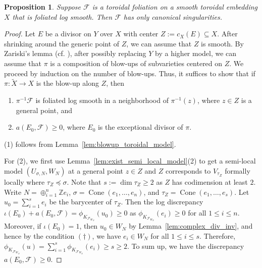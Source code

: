 \documentclass[12pt,reqno]{amsart}
\newtheorem{proposition}[theorem]{Proposition}
\theoremstyle{definition}
\newcommand{\on}{\operatorname}
\newcommand\cF{{\mathcal{F}}}
\newcommand\bZ{{\mathbb Z}}
\begin{document}
\begin{proposition}\label{SimpleCanonical}
    Suppose $\cF$ is a toroidal foliation on a smooth toroidal embedding $X$ that is foliated log smooth. 
    Then $\cF$ has only canonical singularities.
\end{proposition}
\begin{proof}
    Let $E$ be a divisor on $Y$ over $X$ with center $Z:=c_X(E)\subseteq X$.
    After shrinking around the generic point of $Z$, we can assume that $Z$ is smooth. 
    By Zariski's lemma (cf. \cite[Lemma 2.45]{KM98}), after possibly replacing $Y$ by a higher model, we can assume that $\pi$ is a composition of blow-ups of subvarieties centered on $Z$. 
    We proceed by induction on the number of blow-ups. 
    Thus, it suffices to show that if $\pi\colon \widetilde{X}\to X$ is the blow-up along $Z$, then 
    \begin{enumerate}
        \item $\pi^{-1}\cF$ is foliated log smooth in a neighborhood of $\pi^{-1}(z)$, where $z\in Z$ is a general point, and
        \item $a(E_0,\cF)\geq 0$, where $E_0$ is the exceptional divisor of $\pi$. 
    \end{enumerate}
    
    (1) follows from Lemma~\ref{lem:blowup_toroidal_model}. 
    
    For (2), we first use Lemma~\ref{lem:exist_semi_local_model}(2) to get a semi-local model $(U_{\sigma,N},W_N)$ at a general point $z\in Z$ and $Z$ corresponds to $V_{\tau_Z}$ formally locally where $\tau_Z\preceq\sigma$. 
    Note that $s:=\dim\tau_Z\geq 2$ as $Z$ has codimension at least $2$. 
    Write $N=\oplus_{i=1}^n\bZ e_i$, $\sigma=\on{Cone}(e_1,\ldots,e_n)$, and $\tau_Z=\on{Cone}(e_1,\ldots,e_s)$. 
    Let $u_0=\sum_{i=1}^s e_i$ be the barycenter of $\tau_Z$. 
    Then the log discrepancy $\iota(E_0)+a(E_0,\cF) = \phi_{K_{\cF_{W_N}}}(u_0)\geq 0$ as $\phi_{K_{\cF_{W_N}}}(e_i)\geq 0$ for all $1\leq i\leq n$. 
    Moreover, if $\iota(E_0)=1$, then $u_0\in W_N$ by Lemma~\ref{lem:complex_div_inv}, and hence by the condition $(\dagger)$, we have $e_i\in W_N$ for all $1\leq i\leq s$. 
    Therefore, $\phi_{K_{\cF_{W_N}}}(u)=\sum_{i=1}^s\phi_{K_{\cF_{W_N}}}(e_i)\geq s\geq 2$. 
    To sum up, we have the discrepancy $a(E_0,\cF)\geq 0$. 
\end{proof}
\end{document}
